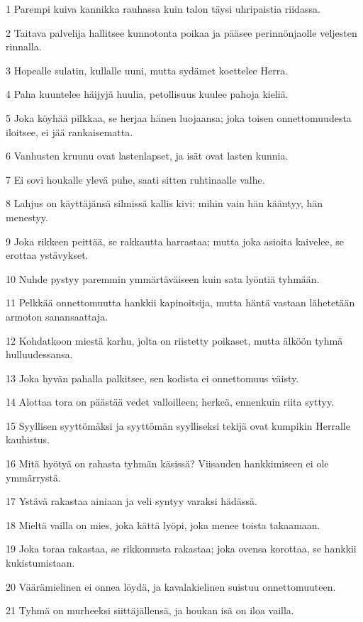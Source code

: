 \par 1 Parempi kuiva kannikka rauhassa kuin talon täysi uhripaistia riidassa.
\par 2 Taitava palvelija hallitsee kunnotonta poikaa ja pääsee perinnönjaolle veljesten rinnalla.
\par 3 Hopealle sulatin, kullalle uuni, mutta sydämet koettelee Herra.
\par 4 Paha kuuntelee häijyjä huulia, petollisuus kuulee pahoja kieliä.
\par 5 Joka köyhää pilkkaa, se herjaa hänen luojaansa; joka toisen onnettomuudesta iloitsee, ei jää rankaisematta.
\par 6 Vanhusten kruunu ovat lastenlapset, ja isät ovat lasten kunnia.
\par 7 Ei sovi houkalle ylevä puhe, saati sitten ruhtinaalle valhe.
\par 8 Lahjus on käyttäjänsä silmissä kallis kivi: mihin vain hän kääntyy, hän menestyy.
\par 9 Joka rikkeen peittää, se rakkautta harrastaa; mutta joka asioita kaivelee, se erottaa ystävykset.
\par 10 Nuhde pystyy paremmin ymmärtäväiseen kuin sata lyöntiä tyhmään.
\par 11 Pelkkää onnettomuutta hankkii kapinoitsija, mutta häntä vastaan lähetetään armoton sanansaattaja.
\par 12 Kohdatkoon miestä karhu, jolta on riistetty poikaset, mutta älköön tyhmä hulluudessansa.
\par 13 Joka hyvän pahalla palkitsee, sen kodista ei onnettomuus väisty.
\par 14 Alottaa tora on päästää vedet valloilleen; herkeä, ennenkuin riita syttyy.
\par 15 Syyllisen syyttömäksi ja syyttömän syylliseksi tekijä ovat kumpikin Herralle kauhistus.
\par 16 Mitä hyötyä on rahasta tyhmän käsissä? Viisauden hankkimiseen ei ole ymmärrystä.
\par 17 Ystävä rakastaa ainiaan ja veli syntyy varaksi hädässä.
\par 18 Mieltä vailla on mies, joka kättä lyöpi, joka menee toista takaamaan.
\par 19 Joka toraa rakastaa, se rikkomusta rakastaa; joka ovensa korottaa, se hankkii kukistumistaan.
\par 20 Väärämielinen ei onnea löydä, ja kavalakielinen suistuu onnettomuuteen.
\par 21 Tyhmä on murheeksi siittäjällensä, ja houkan isä on iloa vailla.
